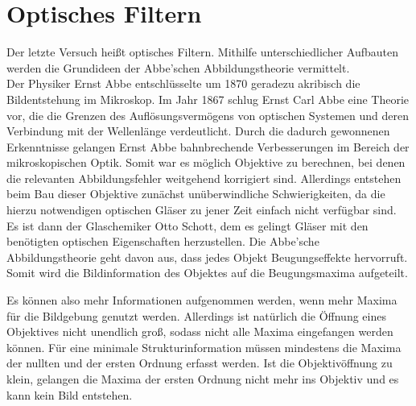 \chapter{Optisches Filtern}
Der letzte Versuch heißt optisches Filtern. Mithilfe unterschiedlicher Aufbauten werden die Grundideen der Abbe'schen Abbildungstheorie vermittelt. \\
Der Physiker Ernst Abbe entschlüsselte  um 1870 geradezu akribisch die Bildentstehung im Mikroskop. 
Im Jahr 1867 schlug Ernst Carl Abbe eine Theorie vor, die die Grenzen des Auflösungsvermögens von optischen Systemen und deren Verbindung mit der Wellenlänge verdeutlicht.
Durch die dadurch gewonnenen Erkenntnisse gelangen Ernst Abbe bahnbrechende Verbesserungen im Bereich der mikroskopischen Optik. 
Somit war es möglich Objektive zu berechnen, bei denen die relevanten Abbildungsfehler weitgehend korrigiert sind. Allerdings entstehen beim Bau dieser Objektive zunächst unüberwindliche Schwierigkeiten, da die hierzu notwendigen optischen Gläser zu jener Zeit einfach nicht verfügbar sind. Es ist dann der Glaschemiker Otto Schott, dem es gelingt Gläser mit den benötigten optischen Eigenschaften herzustellen.
Die Abbe'sche Abbildungstheorie geht davon aus, dass jedes Objekt Beugungseffekte hervorruft. Somit wird die Bildinformation des Objektes auf die Beugungsmaxima aufgeteilt.
	
Es können also mehr Informationen aufgenommen werden, wenn mehr Maxima für die Bildgebung genutzt werden.
Allerdings ist natürlich die Öffnung eines Objektives nicht unendlich groß, sodass nicht alle Maxima eingefangen werden können.
Für eine minimale Strukturinformation müssen mindestens die Maxima der nullten und der ersten Ordnung erfasst werden.
Ist die Objektivöffnung zu klein, gelangen die Maxima der ersten Ordnung nicht mehr ins Objektiv und es kann kein Bild entstehen.



